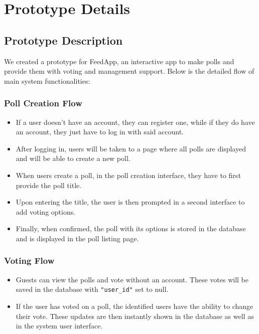 \section{Prototype Details}
\label{prototype_details}

\subsection{Prototype Description}

We created a prototype for FeedApp, an interactive app to make polls and provide them with voting and management support. Below is the detailed flow of main system functionalities:

\subsubsection{Poll Creation Flow}
\begin{itemize}
    \item If a user doesn’t have an account, they can register one, while if they do have an account, they just have to log in with said account.
    \item After logging in, users will be taken to a page where all polls are displayed and will be able to create a new poll.
    \item When users create a poll, in the poll creation interface, they have to first provide the poll title.
    \item Upon entering the title, the user is then prompted in a second interface to add voting options.
    \item Finally, when confirmed, the poll with its options is stored in the database and is displayed in the poll listing page.
\end{itemize}

\subsubsection{Voting Flow}
\begin{itemize}
    \item Guests can view the polls and vote without an account. These votes will be saved in the database with \texttt{"user\_id"} set to null.
    \item If the user has voted on a poll, the identified users have the ability to change their vote. These updates are then instantly shown in the database as well as in the system user interface.
\end{itemize}

